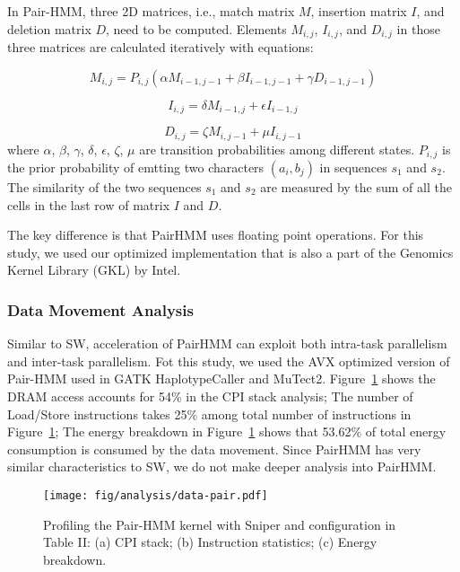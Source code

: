 In Pair-HMM, three 2D matrices, i.e., match matrix $M$, insertion matrix $I$, and deletion matrix $D$, need to be computed. Elements $M_{i,j}$, $I_{i,j}$, and $D_{i,j}$ in those three matrices are calculated iteratively with equations:

\begin{equation}
    M_{i,j} = P_{i,j}(\alpha M_{i-1,j-1} + \beta I_{i-1,j-1} + \gamma D_{i-1,j-1})
\end{equation}

\begin{equation}
    I_{i,j} = \delta M_{i-1,j} + \epsilon I_{i-1,j}
\end{equation}

\begin{equation}
    D_{i,j} = \zeta M_{i,j-1} + \mu I_{i,j-1}
\end{equation}
where $\alpha$, $\beta$, $\gamma$, $\delta$, $\epsilon$, $\zeta$, $\mu$ are transition probabilities among different states. $P_{i,j}$ is the prior probability of emtting two characters $(a_i, b_j)$ in sequences $s_1$ and $s_2$. The similarity of the two sequences $s_1$ and $s_2$ are measured by the sum of all the cells in the last row of matrix $I$ and $D$.

The key difference is that PairHMM uses floating point operations. For this study, we used our optimized implementation that is also a part of the Genomics Kernel Library (GKL) by Intel.

\subsubsection{Data Movement Analysis}
Similar to SW, acceleration of PairHMM can exploit both intra-task parallelism and inter-task parallelism. Fot this study, we used the AVX optimized version of Pair-HMM used in GATK HaplotypeCaller and MuTect2. Figure~\ref{fig:data-pair} shows the DRAM access accounts for 54\% in the CPI stack analysis; The number of Load/Store instructions takes 25\% among total number of instructions in Figure~\ref{fig:data-pair}; The energy breakdown in Figure~\ref{fig:data-pair} shows that 53.62\% of total energy consumption is consumed by the data movement. Since PairHMM has very similar characteristics to SW, we do not make deeper analysis into PairHMM. 

\begin{figure}[htbp]
\centering
\texttt{[image: fig/analysis/data-pair.pdf]}
\caption{Profiling the Pair-HMM kernel with Sniper and configuration in Table II: (a) CPI stack; (b) Instruction statistics; (c) Energy breakdown.}
\label{fig:data-pair}
\end{figure}


